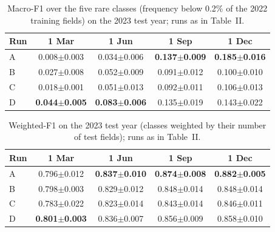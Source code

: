 \begin{table}[t]
\caption{Macro-F1 over the five rare classes (frequency below 0.2\% of the 2022 training fields) on the 2023 test year; runs as in Table~II.}
\label{tab:rare}
\centering
\begin{tabular}{lcccc}
\hline
Run & 1 Mar & 1 Jun & 1 Sep & 1 Dec \\
\hline
A & 0.008$\pm$0.003 & 0.034$\pm$0.006 & \textbf{0.137$\pm$0.009} & \textbf{0.185$\pm$0.016} \\
B & 0.027$\pm$0.008 & 0.052$\pm$0.009 & 0.091$\pm$0.012 & 0.100$\pm$0.010 \\
C & 0.018$\pm$0.001 & 0.051$\pm$0.013 & 0.092$\pm$0.011 & 0.106$\pm$0.013 \\
D & \textbf{0.044$\pm$0.005} & \textbf{0.083$\pm$0.006} & 0.135$\pm$0.019 & 0.143$\pm$0.022 \\
\hline
\end{tabular}
\end{table}

\begin{table}[t]
\caption{Weighted-F1 on the 2023 test year (classes weighted by their number of test fields); runs as in Table~II.}
\label{tab:weighted}
\centering
\begin{tabular}{lcccc}
\hline
Run & 1 Mar & 1 Jun & 1 Sep & 1 Dec \\
\hline
A & 0.796$\pm$0.012 & \textbf{0.837$\pm$0.010} & \textbf{0.874$\pm$0.008} & \textbf{0.882$\pm$0.005} \\
B & 0.798$\pm$0.003 & 0.829$\pm$0.012 & 0.848$\pm$0.014 & 0.848$\pm$0.014 \\
C & 0.783$\pm$0.022 & 0.823$\pm$0.014 & 0.843$\pm$0.014 & 0.846$\pm$0.011 \\
D & \textbf{0.801$\pm$0.003} & 0.836$\pm$0.007 & 0.856$\pm$0.009 & 0.858$\pm$0.010 \\
\hline
\end{tabular}
\end{table}

